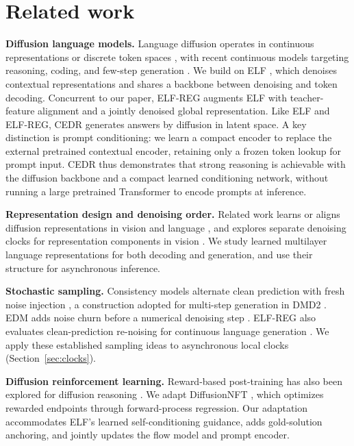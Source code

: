 \documentclass[11pt,letterpaper]{article}
\begin{document}
\section{Related work}
\label{sec:relatedwork}

\textbf{Diffusion language models.} Language diffusion operates in continuous representations \citep{plaid,tess2,hyperspherical} or discrete token spaces \citep{mdlm,llada,dbtm}, with recent continuous models targeting reasoning, coding, and few-step generation \citep{posterior,mlfm,plaidq}. We build on ELF \citep{elf}, which denoises contextual representations and shares a backbone between denoising and token decoding. Concurrent to our paper, ELF-REG \citep{scalingdlm} augments ELF with teacher-feature alignment and a jointly denoised global representation. Like ELF and ELF-REG, CEDR generates answers by diffusion in latent space. A key distinction is prompt conditioning: we learn a compact encoder to replace the external pretrained contextual encoder, retaining only a frozen token lookup for prompt input. CEDR thus demonstrates that strong reasoning is achievable with the diffusion backbone and a compact learned conditioning network, without running a large pretrained Transformer to encode prompts at inference.

\textbf{Representation design and denoising order.} Related work learns or aligns diffusion representations in vision and language \citep{repa,textldm,ldlm}, and explores separate denoising clocks for representation components in vision \citep{sfd,latentforcing}. We study learned multilayer language representations for both decoding and generation, and use their structure for asynchronous inference.

\textbf{Stochastic sampling.} Consistency models alternate clean prediction with fresh noise injection \citep{consistencymodels}, a construction adopted for multi-step generation in DMD2 \citep{dmd2}. EDM adds noise churn before a numerical denoising step \citep{edm}. ELF-REG also evaluates clean-prediction re-noising for continuous language generation \citep{scalingdlm}. We apply these established sampling ideas to asynchronous local clocks (Section~\ref{sec:clocks}).

\textbf{Diffusion reinforcement learning.} Reward-based post-training has also been explored for diffusion reasoning \citep{d1,llada15,ladirl}. We adapt DiffusionNFT \citep{diffusionnft}, which optimizes rewarded endpoints through forward-process regression. Our adaptation accommodates ELF's learned self-conditioning guidance, adds gold-solution anchoring, and jointly updates the flow model and prompt encoder.
\end{document}
